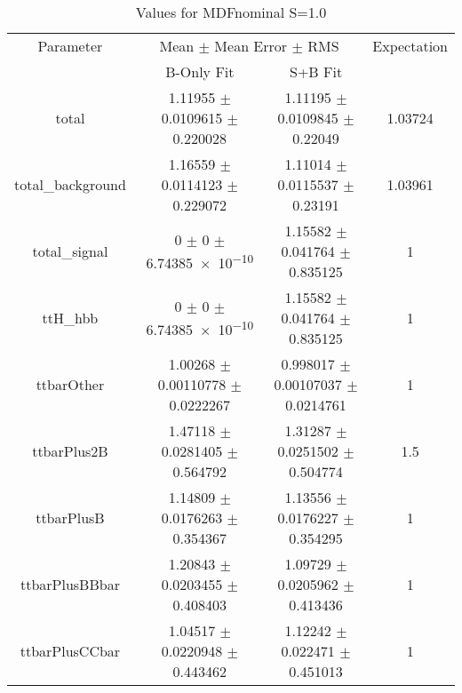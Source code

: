 \begin{table}
\centering
\caption{Values for MDFnominal S=1.0}
\begin{tabular}{cccc}
\toprule
Parameter & \multicolumn{2}{c}{Mean $\pm$ Mean Error $\pm$ RMS} & Expectation\\
 & B-Only Fit & S+B Fit & \\
\midrule
total & \num{1.11955} $\pm$ \num{0.0109615} $\pm$ \num{0.220028} & \num{1.11195} $\pm$ \num{0.0109845} $\pm$ \num{0.22049} & \num{1.03724}\\
total\_background & \num{1.16559} $\pm$ \num{0.0114123} $\pm$ \num{0.229072} & \num{1.11014} $\pm$ \num{0.0115537} $\pm$ \num{0.23191} & \num{1.03961}\\
total\_signal & \num{0} $\pm$ \num{0} $\pm$ \num{6.74385e-10} & \num{1.15582} $\pm$ \num{0.041764} $\pm$ \num{0.835125} & \num{1}\\
ttH\_hbb & \num{0} $\pm$ \num{0} $\pm$ \num{6.74385e-10} & \num{1.15582} $\pm$ \num{0.041764} $\pm$ \num{0.835125} & \num{1}\\
ttbarOther & \num{1.00268} $\pm$ \num{0.00110778} $\pm$ \num{0.0222267} & \num{0.998017} $\pm$ \num{0.00107037} $\pm$ \num{0.0214761} & \num{1}\\
ttbarPlus2B & \num{1.47118} $\pm$ \num{0.0281405} $\pm$ \num{0.564792} & \num{1.31287} $\pm$ \num{0.0251502} $\pm$ \num{0.504774} & \num{1.5}\\
ttbarPlusB & \num{1.14809} $\pm$ \num{0.0176263} $\pm$ \num{0.354367} & \num{1.13556} $\pm$ \num{0.0176227} $\pm$ \num{0.354295} & \num{1}\\
ttbarPlusBBbar & \num{1.20843} $\pm$ \num{0.0203455} $\pm$ \num{0.408403} & \num{1.09729} $\pm$ \num{0.0205962} $\pm$ \num{0.413436} & \num{1}\\
ttbarPlusCCbar & \num{1.04517} $\pm$ \num{0.0220948} $\pm$ \num{0.443462} & \num{1.12242} $\pm$ \num{0.022471} $\pm$ \num{0.451013} & \num{1}\\
\bottomrule
\end{tabular}
\end{table}